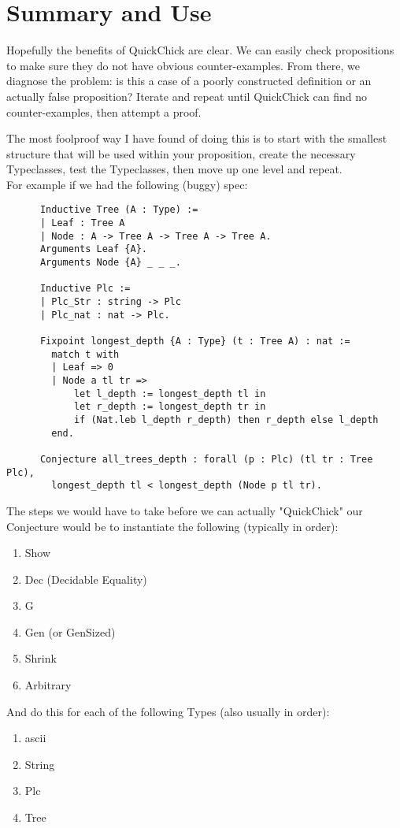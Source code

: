 \documentclass{article}
\begin{document}
  
    \section{Summary and Use}
    Hopefully the benefits of QuickChick are clear. 
    We can easily check propositions to make sure they do not have obvious counter-examples.
    From there, we diagnose the problem: is this a case of a poorly constructed definition or an actually false proposition? 
    Iterate and repeat until QuickChick can find no counter-examples, then attempt a proof.

    The most foolproof way I have found of doing this is to start with the smallest structure that will be used within your proposition, create the necessary Typeclasses, test the Typeclasses, then move up one level and repeat. \\
    For example if we had the following (buggy) spec:
    \begin{verbatim}     
      Inductive Tree (A : Type) :=
      | Leaf : Tree A 
      | Node : A -> Tree A -> Tree A -> Tree A.
      Arguments Leaf {A}.
      Arguments Node {A} _ _ _.

      Inductive Plc :=
      | Plc_Str : string -> Plc
      | Plc_nat : nat -> Plc.

      Fixpoint longest_depth {A : Type} (t : Tree A) : nat :=
        match t with
        | Leaf => 0
        | Node a tl tr => 
            let l_depth := longest_depth tl in
            let r_depth := longest_depth tr in
            if (Nat.leb l_depth r_depth) then r_depth else l_depth
        end.
      
      Conjecture all_trees_depth : forall (p : Plc) (tl tr : Tree Plc),
        longest_depth tl < longest_depth (Node p tl tr).
    \end{verbatim}
    The steps we would have to take before we can actually "QuickChick" our Conjecture would be to instantiate the following (typically in order): 
    \begin{enumerate}
      \item Show
      \item Dec (Decidable Equality)
      \item G
      \item Gen (or GenSized)
      \item Shrink
      \item Arbitrary
    \end{enumerate}
    And do this for each of the following Types (also usually in order):
    \begin{enumerate}
      \item ascii
      \item String
      \item Plc
      \item Tree
    \end{enumerate}
\end{document}
